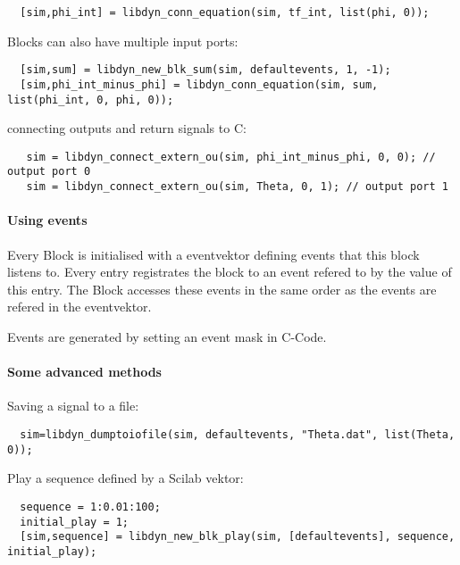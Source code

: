 \documentclass[%
	pdftex,%
	a4paper,%
	oneside,%
	11pt,%
	halfparskip,%
	headsepline,%
	bibtotocnumbered,%
	idxtotoc%
]{scrartcl}
\begin{document}
\begin{verbatim}
  [sim,phi_int] = libdyn_conn_equation(sim, tf_int, list(phi, 0));
\end{verbatim}

Blocks can also have multiple input ports:

\begin{verbatim}
  [sim,sum] = libdyn_new_blk_sum(sim, defaultevents, 1, -1);
  [sim,phi_int_minus_phi] = libdyn_conn_equation(sim, sum, list(phi_int, 0, phi, 0));
\end{verbatim}

connecting outputs and return signals to C:

\begin{verbatim}
   sim = libdyn_connect_extern_ou(sim, phi_int_minus_phi, 0, 0); // output port 0
   sim = libdyn_connect_extern_ou(sim, Theta, 0, 1); // output port 1
\end{verbatim}


\paragraph{Using events}

Every Block is initialised with a eventvektor defining events that this block listens to. Every entry registrates the block to an event refered to by the value of this entry. The Block accesses these events in the same order as the events are refered in the eventvektor. 


Events are generated by setting an event mask in C-Code.

\paragraph{Some advanced methods}


Saving a signal to a file:

\begin{verbatim}
  sim=libdyn_dumptoiofile(sim, defaultevents, "Theta.dat", list(Theta, 0));
\end{verbatim}

Play a sequence defined by a Scilab vektor:

\begin{verbatim}
  sequence = 1:0.01:100;
  initial_play = 1;
  [sim,sequence] = libdyn_new_blk_play(sim, [defaultevents], sequence, initial_play); 
\end{verbatim}
\end{document}
